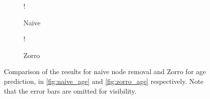 \begin{figure}[H]
    \centering
        \begin{subfigure}{.5\textwidth}
            \centering
            \begin{center}
                \resizebox {1.0\linewidth} {!} {
                    
                }
            \end{center}
            \caption{Naive}
            \label{fig:comparison_age_naive}
        \end{subfigure}%
        \begin{subfigure}{.5\textwidth}
            \centering
            \begin{center}
                \resizebox {1.0\linewidth} {!} {
                    
                }
            \end{center}
            \caption{Zorro}
            \label{fig:comparison_age_zorro}
        \end{subfigure}
    \caption{Comparison of the results for naive node removal and Zorro for age prediction, in \cref{fig:naive_age} and \cref{fig:zorro_age} respectively. Note that the error bars are omitted for visibility.}
    \label{fig:comparison_age}
\end{figure}
